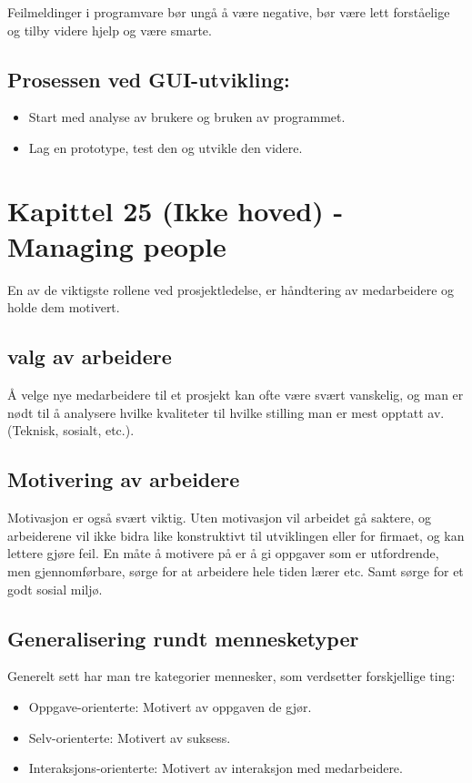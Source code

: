 \documentclass[11pt]{article}
\begin{document}
  Feilmeldinger i programvare bør ungå å være negative, bør være lett forståelige og tilby videre hjelp og være smarte.
\subsection{Prosessen ved GUI-utvikling:}
\label{sec-14.2}

\begin{itemize}
\item Start med analyse av brukere og bruken av programmet.
\item Lag en prototype, test den og utvikle den videre.
\end{itemize}
\section{Kapittel 25 (Ikke hoved) - Managing people}
\label{sec-15}

  En av de viktigste rollene ved prosjektledelse, er håndtering av medarbeidere og holde dem motivert.
\subsection{valg av arbeidere}
\label{sec-15.1}

  Å velge nye medarbeidere til et prosjekt kan ofte være svært vanskelig, 
  og man er nødt til å analysere hvilke kvaliteter til hvilke stilling man 
  er mest opptatt av. (Teknisk, sosialt, etc.).
\subsection{Motivering av arbeidere}
\label{sec-15.2}

   Motivasjon er også svært viktig. Uten motivasjon vil arbeidet gå saktere, 
   og arbeiderene vil ikke bidra like konstruktivt til utviklingen eller for 
   firmaet, og kan lettere gjøre feil. En måte å motivere på er å gi oppgaver 
   som er utfordrende, men gjennomførbare, sørge for at arbeidere hele tiden 
   lærer etc. Samt sørge for et godt sosial miljø.
\subsection{Generalisering rundt mennesketyper}
\label{sec-15.3}

   Generelt sett har man tre kategorier mennesker, som verdsetter forskjellige ting:

\begin{itemize}
\item Oppgave-orienterte: 
     Motivert av oppgaven de gjør.
\item Selv-orienterte: 
     Motivert av suksess.
\item Interaksjons-orienterte: 
     Motivert av interaksjon med medarbeidere.
\end{itemize}
\end{document}
